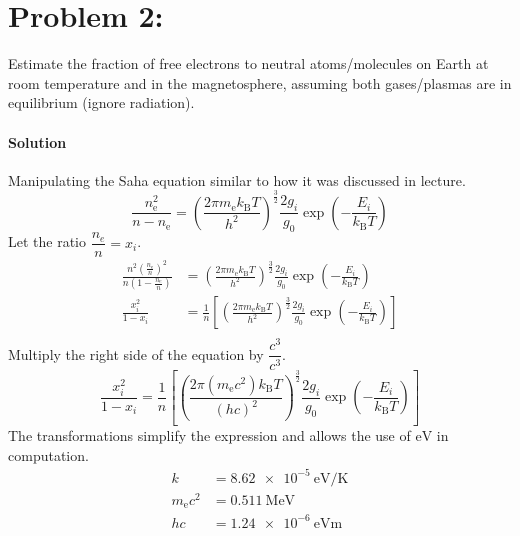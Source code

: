 \documentclass{article}
\begin{document}
	\section*{Problem 2: }
	Estimate the fraction of free electrons to neutral atoms/molecules on Earth at room temperature and in the magnetosphere, assuming both gases/plasmas are in equilibrium (ignore radiation).
		\paragraph{Solution} Manipulating the Saha equation similar to how it was discussed in lecture. \\
		
		\[
			\frac{n^2_\mathrm{e}}{n-n_\mathrm{e}} = \left( \frac{2\pi m_\mathrm{e} k_\mathrm{B}T}{h^2} \right)^\frac{3}{2} \frac{2g_i}{g_0} \exp\left( -\frac{E_i}{k_\mathrm{B}T} \right)
		\]
		Let the ratio $\dfrac{n_e}{n} = x_i$.
		\begin{equation*}
			\begin{split}
				\frac{ n^2 \left( \frac{n_\mathrm{e}}{n} \right)^2}{n\left( 1 - \frac{n_\mathrm{e}}{n} \right)} &= \left( \frac{2\pi m_\mathrm{e} k_\mathrm{B}T}{h^2} \right)^\frac{3}{2} \frac{2g_i}{g_0} \exp\left( -\frac{E_i}{k_\mathrm{B}T} \right) \\
				\frac{x^2_i}{1 - x_i} &= \frac{1}{n} \left[ \left( \frac{2\pi m_\mathrm{e} k_\mathrm{B}T}{h^2} \right)^\frac{3}{2} \frac{2g_i}{g_0} \exp\left( -\frac{E_i}{k_\mathrm{B}T} \right) \right] \\
			\end{split}
		\end{equation*}
		Multiply the right side of the equation by $\dfrac{c^3}{c^3}$.
		\[
			\frac{x^2_i}{1 - x_i} = \frac{1}{n} \left[ \left( \frac{2\pi (m_\mathrm{e}c^2) k_\mathrm{B}T}{(hc)^2} \right)^\frac{3}{2} \frac{2g_i}{g_0} \exp\left( -\frac{E_i}{k_\mathrm{B}T} \right) \right]	
		\]
		The transformations simplify the expression and allows the use of $\unit{\electronvolt}$ in computation.
		\begin{equation*}
			\begin{split}
				k &= \qty{8.62e-5}{\electronvolt\per\kelvin} \\
				m_\mathrm{e}c^2 &= \qty{0.511}{\mega\electronvolt} \\
				hc &= \qty{1.24e-6}{\electronvolt\meter} \\
			\end{split}
		\end{equation*}
		
\end{document}
